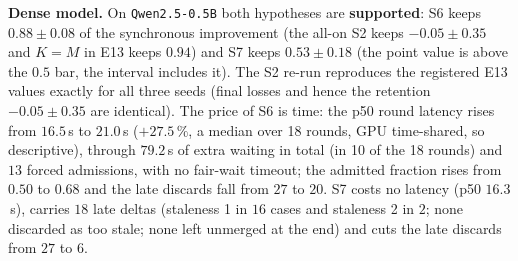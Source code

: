 \documentclass[11pt,a4paper]{article}
\begin{document}
\begin{table}[ht!]
\centering
\caption{E14 (three seeds, $\pm$ = 95\,\% half-width). Retention $\rho$ is relative to the synchronous baseline S0 of the same invocation; the viability bar is $0.5$. $L(\mathrm{S2})-L(\mathrm{cell})$ is positive when the mechanism lowers the held-out loss against S2. Round latency is the p50 over 18 rounds on a time-shared GPU (descriptive). Source receipts: \texttt{E14\_report\_qwen0.5b.json}, \texttt{E14\_report\_granite1b.json}.}
\label{tab:e14}
\vspace{0.35em}
\end{table}

\textbf{Dense model.} On \texttt{Qwen2.5-0.5B} both hypotheses are \textbf{supported}: S6 keeps $0.88 \pm 0.08$ of the synchronous improvement (the all-on S2 keeps $-0.05 \pm 0.35$ and $K=M$ in E13 keeps $0.94$) and S7 keeps $0.53 \pm 0.18$ (the point value is above the $0.5$ bar, the interval includes it). The S2 re-run reproduces the registered E13 values exactly for all three seeds (final losses and hence the retention $-0.05 \pm 0.35$ are identical). The price of S6 is time: the p50 round latency rises from $16.5$\,s to $21.0$\,s (\textbf{$+27.5\,\%$}, a median over 18 rounds, GPU time-shared, so descriptive), through $79.2$\,s of extra waiting in total (in 10 of the 18 rounds) and $13$ forced admissions, with no fair-wait timeout; the admitted fraction rises from $0.50$ to $0.68$ and the late discards fall from $27$ to $20$. S7 costs no latency (p50 $16.3$\,s), carries $18$ late deltas (staleness 1 in $16$ cases and staleness 2 in $2$; none discarded as too stale; none left unmerged at the end) and cuts the late discards from $27$ to $6$.
\end{document}
